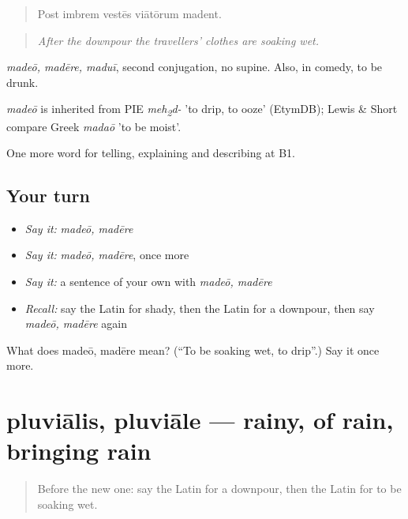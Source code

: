 \begin{quote}
Post imbrem vestēs viātōrum madent.
\end{quote}

\begin{quote}
\emph{After the downpour the travellers' clothes are soaking wet.}
\end{quote}

\emph{madeō, madēre, maduī}, second conjugation, no supine. Also, in comedy, to be drunk.

\begin{cousinweb}
\emph{madeō} is inherited from PIE \emph{meh\textsubscript{2}d-} 'to drip, to ooze' (EtymDB); Lewis \& Short compare Greek \emph{madaō} 'to be moist'.
\end{cousinweb}

\begin{grammarlens}[title={What you've built}]
One more word for telling, explaining and describing at B1.
\end{grammarlens}

\subsection*{Your turn}
\begin{itemize}
\raggedright
  \item \emph{Say it:} \emph{madeō, madēre}
  \item \emph{Say it:} \emph{madeō, madēre}, once more
  \item \emph{Say it:} a sentence of your own with \emph{madeō, madēre}
  \item \emph{Recall:} say the Latin for shady, then the Latin for a downpour, then say \emph{madeō, madēre} again
\end{itemize}

\begin{tcolorbox}[breakable,colback=teal!4,colframe=teal!35!black,title={Before you move on}]
What does madeō, madēre mean? (\textquotedblleft{}To be soaking wet, to drip\textquotedblright{}.) Say it once more.
\end{tcolorbox}
\section[pluviālis, pluviāle]{pluviālis, pluviāle — rainy, of rain, bringing rain}

\label{lesson:LA-C485-pluvialis}



\begin{quote}
Before the new one: say the Latin for a downpour, then the Latin for to be soaking wet.
\end{quote}

